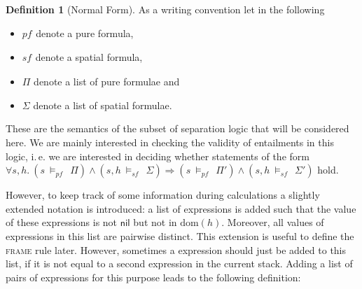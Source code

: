\documentclass{scrartcl}
\theoremstyle{definition}
\newtheorem{definition}{Definition}
\newcommand{\nil}{{\textsf{nil}}}
\newcommand{\modelspf}{{\models_{\textit{pf}}\ }}
\newcommand{\modelssf}{{\models_{\textit{sf}}\ }}
\newcommand{\varpf}[1]{\textit{pf}_{#1}}
\newcommand{\varsf}[1]{\textit{sf}_{#1}}
\newcommand{\dom}{{\text{dom}}}
\begin{document}
\begin{definition}[Normal Form]
\noindent
As a writing convention let in the following
\begin{itemize}
  \item $\varpf {}$ denote a pure formula,
  \item $\varsf {}$ denote a spatial formula,
  \item $\Pi$ denote a list of pure formulae and
  \item $\Sigma$ denote a list of spatial formulae.
\end{itemize}
\end{definition}
\bigskip

These are the semantics of the subset of separation logic that will be
considered here. We are mainly interested in checking the validity of
entailments in this logic, i.\,e. we are interested in deciding whether
statements of the form $\forall s,h.\ \left(s\ \modelspf\ \Pi\right) \wedge
\left(s,h\ \modelssf\ \Sigma\right) \Rightarrow
\left(s\ \modelspf\ \Pi'\right) \wedge \left(s,h\ \modelssf\ \Sigma'\right)$ hold.

However, to keep track of some information during calculations a slightly
extended notation is introduced: a list of expressions is added such that
the value of these expressions is not $\nil$ but not in $\dom(h)$. Moreover,
all values of expressions in this list are pairwise distinct. This extension is
useful to define the \textsc{frame} rule later. However, sometimes a
expression should just be added to this list, if it is not equal to a second
expression in the current stack. Adding a list of pairs of expressions
for this purpose leads to the following definition:
\end{document}
